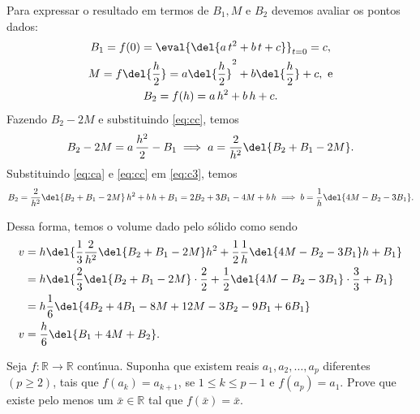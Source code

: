 \documentclass{IMTexam}
\begin{document}
\begin{questions}
\begin{solution}
			Para expressar o resultado em termos de $ B_1,M $ e $ B_2 $ devemos avaliar os pontos dados:
			\begin{gather}
				B_1=f(0)=\eval{\del{a\,t^{2}+b\,t+c}}_{t=0}=c,\label{eq:cc} \\
				M=f\del{\dfrac{h}{2}}=a\del{\dfrac{h}{2}}^{2}+b\del{\dfrac{h}{2}}+c,\text{ e}\label{eq:c2}\\
				B_2=f(h)=a\,h^{2}+b\,h+c.\label{eq:c3}
			\end{gather}
			Fazendo $ B_2-2M $ e substituindo \ref{eq:cc}, temos
			\begin{equation}\label{eq:ca}
				B_2-2M=a\,\dfrac{h^{2}}{2}-B_1\implies a=\dfrac{2}{h^{2}}\del{B_2+B_1-2M}.
			\end{equation}
			Substituindo \ref{eq:ca} e \ref{eq:cc} em \ref{eq:c3}, temos
			\begin{equation}\label{eq:cb}
				B_2=\dfrac{2}{h^{2}}\del{B_2+B_1-2M}\,h^{2}+b\,h+B_1=2B_2+3B_1-4M+b\,h\implies b=\dfrac{1}{h}\del{4M-B_2-3B_1}.
			\end{equation}
		
			Dessa forma, temos o volume dado pelo sólido como sendo
			\begin{align*}
				v&=h\del{\dfrac{1}{3}\dfrac{2}{h^{2}}\del{B_2+B_1-2M}h^{2}+\dfrac{1}{2}\dfrac{1}{h}\del{4M-B_2-3B_1}h+B_1}\\
				&=h\del{\dfrac{2}{3}\del{B_2+B_1-2M}\cdot\dfrac{2}{2}+\dfrac{1}{2}\del{4M-B_2-3B_1}\cdot\dfrac{3}{3}+B_1}\\
				&=h\dfrac{1}{6}\del{4B_2+4B_1-8M+12M-3B_2-9B_1+6B_1}\\
				v&=\dfrac{h}{6}\del{B_1+4M+B_2}.
			\end{align*}
		
		\end{solution}
		
		
		Seja $ f : \mathbb{R} \to \mathbb{R} $ contı́nua. Suponha que existem reais $ a_1, a_2, \ldots, a_p $ diferentes $ (p \geqslant 2) $, tais que $ f(a_k) =a_{k+1} $, se $ 1 \leqslant k \leqslant p-1 $ e $ f(a_p) = a_1 $. Prove que existe pelo menos um $ \bar{x} \in \mathbb{R} $ tal que $ f(\bar{x}) = \bar{x} $.
		
		\begin{solution}

\end{solution}
\end{questions}
\end{document}
